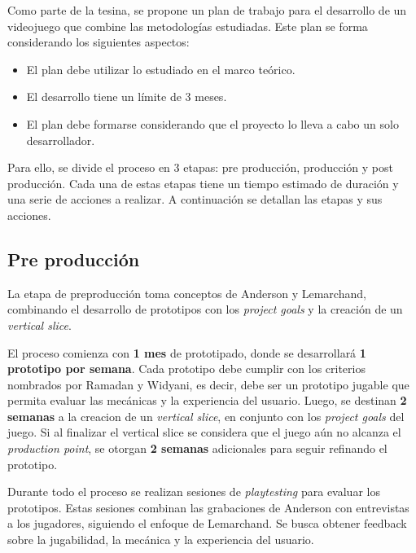 \par Como parte de la tesina, se propone un plan de trabajo para el desarrollo de un videojuego que combine las metodologías estudiadas. Este plan se forma considerando los siguientes aspectos:
\begin{itemize}
    \item El plan debe utilizar lo estudiado en el marco teórico.
    \item El desarrollo tiene un límite de 3 meses.
    \item El plan debe formarse considerando que el proyecto lo lleva a cabo un solo desarrollador.
\end{itemize}
\par Para ello, se divide el proceso en 3 etapas: pre producción, producción y post producción. Cada una de estas etapas tiene un tiempo estimado de duración y una serie de acciones a realizar. A continuación se detallan las etapas y sus acciones. 
%
%
\subsection{Pre producción}
\par La etapa de preproducción toma conceptos de Anderson y Lemarchand, combinando el desarrollo de prototipos con los \textit{project goals} y la creación de un \textit{vertical slice}. 
\par El proceso comienza con \textbf{1 mes} de prototipado, donde se desarrollará \textbf{1 prototipo por semana}. Cada prototipo debe cumplir con los criterios nombrados por Ramadan y Widyani, es decir, debe ser un prototipo jugable que permita evaluar las mecánicas y la experiencia del usuario. Luego, se destinan \textbf{2 semanas} a la creacion de un \textit{vertical slice}, en conjunto con los \textit{project goals} del juego. Si al finalizar el vertical slice se considera que el juego aún no alcanza el \textit{production point}, se otorgan \textbf{2 semanas} adicionales para seguir refinando el prototipo.
\par Durante todo el proceso se realizan sesiones de \textit{playtesting} para evaluar los prototipos. Estas sesiones combinan las grabaciones de Anderson con entrevistas a los jugadores, siguiendo el enfoque de Lemarchand. Se busca obtener feedback sobre la jugabilidad, la mecánica y la experiencia del usuario.  %
%
%
